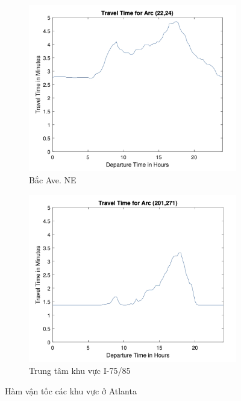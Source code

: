 \documentclass[../main.tex]{subfiles}
\begin{document}
\begin{figure}
\begin{subfigure}{0.45\textwidth}
        \centering
        \includegraphics{edited-images/Figure15c.jpg}
        \caption{Bắc Ave. NE}
        \label{fig:15c}
    \end{subfigure}
    \begin{subfigure}{0.45\textwidth}
        \centering
        \includegraphics{edited-images/Figure15d.jpg}
        \caption{Trung tâm khu vực I-75/85}
        \label{fig:15d}
    \end{subfigure}
    \caption{Hàm vận tốc các khu vực ở Atlanta}
    \label{fig:15}
\end{figure}
\end{document}
